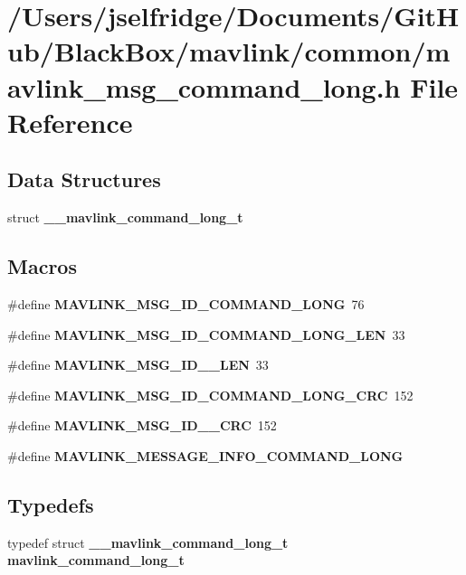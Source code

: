 \section{/\+Users/jselfridge/\+Documents/\+Git\+Hub/\+Black\+Box/mavlink/common/mavlink\+\_\+msg\+\_\+command\+\_\+long.h File Reference}
\label{mavlink__msg__command__long_8h}
\subsection*{Data Structures}
\begin{DoxyCompactItemize}
\item 
struct \textbf{ \+\_\+\+\_\+mavlink\+\_\+command\+\_\+long\+\_\+t}
\end{DoxyCompactItemize}
\subsection*{Macros}
\begin{DoxyCompactItemize}
\item 
\#define \textbf{ M\+A\+V\+L\+I\+N\+K\+\_\+\+M\+S\+G\+\_\+\+I\+D\+\_\+\+C\+O\+M\+M\+A\+N\+D\+\_\+\+L\+O\+NG}~76
\item 
\#define \textbf{ M\+A\+V\+L\+I\+N\+K\+\_\+\+M\+S\+G\+\_\+\+I\+D\+\_\+\+C\+O\+M\+M\+A\+N\+D\+\_\+\+L\+O\+N\+G\+\_\+\+L\+EN}~33
\item 
\#define \textbf{ M\+A\+V\+L\+I\+N\+K\+\_\+\+M\+S\+G\+\_\+\+I\+D\+\_\+\_\+\+L\+EN}~33
\item 
\#define \textbf{ M\+A\+V\+L\+I\+N\+K\+\_\+\+M\+S\+G\+\_\+\+I\+D\+\_\+\+C\+O\+M\+M\+A\+N\+D\+\_\+\+L\+O\+N\+G\+\_\+\+C\+RC}~152
\item 
\#define \textbf{ M\+A\+V\+L\+I\+N\+K\+\_\+\+M\+S\+G\+\_\+\+I\+D\+\_\+\_\+\+C\+RC}~152
\item 
\#define \textbf{ M\+A\+V\+L\+I\+N\+K\+\_\+\+M\+E\+S\+S\+A\+G\+E\+\_\+\+I\+N\+F\+O\+\_\+\+C\+O\+M\+M\+A\+N\+D\+\_\+\+L\+O\+NG}
\end{DoxyCompactItemize}
\subsection*{Typedefs}
\begin{DoxyCompactItemize}
\item 
typedef struct \textbf{ \+\_\+\+\_\+mavlink\+\_\+command\+\_\+long\+\_\+t} \textbf{ mavlink\+\_\+command\+\_\+long\+\_\+t}
\end{DoxyCompactItemize}


